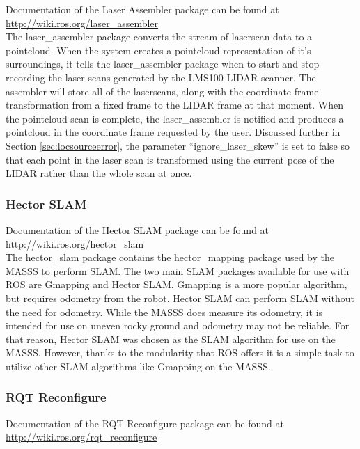 Documentation of the Laser Assembler package can be found at \url{http://wiki.ros.org/laser_assembler}\\

The laser\_assembler package converts the stream of laserscan data to a pointcloud. When the system creates a pointcloud representation of it's surroundings, it tells the laser\_assembler package when to start and stop recording the laser scans generated by the LMS100 LIDAR scanner. The assembler will store all of the laserscans, along with the coordinate frame transformation from a fixed frame to the LIDAR frame at that moment. When the pointcloud scan is complete, the laser\_assembler is notified and produces a pointcloud in the coordinate frame requested by the user. Discussed further in Section \ref{sec:locsourceerror}, the parameter ``ignore\_laser\_skew'' is set to false so that each point in the laser scan is transformed using the current pose of the LIDAR rather than the whole scan at once.\\

\subsubsection{Hector SLAM}

Documentation of the Hector SLAM package can be found at \url{http://wiki.ros.org/hector_slam}\\

The hector\_slam package contains the hector\_mapping package used by the MASSS to perform SLAM. The two main SLAM packages available for use with ROS are Gmapping and Hector SLAM. Gmapping is a more popular algorithm, but requires odometry from the robot. Hector SLAM can perform SLAM without the need for odometry. While the MASSS does measure its odometry, it is intended for use on uneven rocky ground and odometry may not be reliable. For that reason, Hector SLAM was chosen as the SLAM algorithm for use on the MASSS. However, thanks to the modularity that ROS offers it is a simple task to utilize other SLAM algorithms like Gmapping on the MASSS.\\

\subsubsection{RQT Reconfigure}

Documentation of the RQT Reconfigure package can be found at \url{http://wiki.ros.org/rqt_reconfigure}\\

